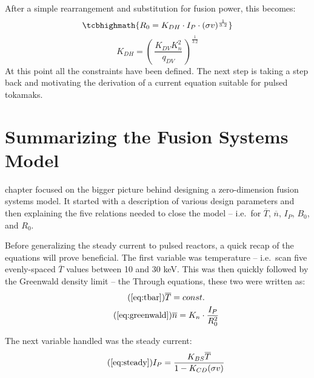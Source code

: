  After a simple rearrangement and substitution for fusion power, this becomes:
\begin{equation}
	\label{eq:r_heat}
	\tcbhighmath{ R_0 = K_{DH} \cdot I_P \cdot (\sigma v)^ {\frac{1}{3.2}} }
\end{equation}
\begin{equation}
	K_{DH} = \left( \, \frac{ K_{DV} K_n^2 }{ q_{DV} } \, \right) ^ {\frac{1}{3.2}}
\end{equation}
At this point all the  constraints have been defined. The next step is taking a step back and motivating the derivation of a current equation suitable for pulsed tokamaks.

\section{Summarizing the Fusion Systems Model}

 chapter focused on the bigger picture behind designing a zero-dimension fusion systems model. It started with a description of various design parameters and then  explaining the five relations needed to close the model -- i.e.\ for $\overline T$, $\overline n$, $I_P$, $B_0$, and $R_0$.

Before generalizing the steady current to  pulsed reactors,  a quick recap of the equations will prove beneficial. The first variable  was temperature -- i.e.\ scan five evenly-spaced $\overline T$ values between 10 and 30 keV. This was then quickly followed by the Greenwald density limit -- the  Through equations, these two were written as:
\begin{gather}
	\tag{\ref{eq:tbar}}
	\overline T = const. \\
	\tag{\ref{eq:greenwald}}
	\overline n = K_n \cdot \frac{I_P}{R_0^2}
\end{gather}

The next variable handled was the steady current:
\begin{equation}
	\tag{\ref{eq:steady}}
	I_P = \frac{K_{BS} \overline T}{1 - K_{CD} ( \sigma v ) }
\end{equation}

